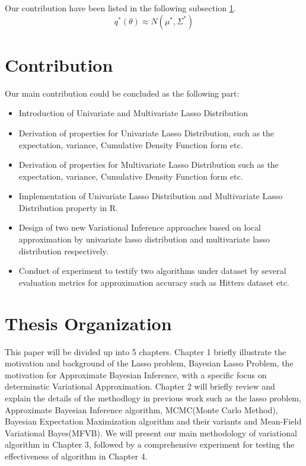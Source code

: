 Our contribution have been listed in the following subsection \ref{cont}.
\begin{equation}
	\label{eq:GV}
	q^{*}(\theta) \approx N(\mu^*,\Sigma^*)
\end{equation}

\section{Contribution}
\label{cont}
Our main contribution could be concluded as the following part:
\begin{itemize}
	\item Introduction of Univariate and Multivariate Lasso Distribution
	\item Derivation of properties for Univariate Lasso Distribution, such as the expectation, variance, Cumulative Density Function form etc.
	\item Derivation of properties for Multivariate Lasso Distribution such as the expectation, variance, Cumulative Density Function form etc.
	\item Implementation of Univariate Lasso Distribution and Multivariate Lasso Distribution property in R.
	\item Design of two new Variational Inference approaches based on local approximation by univariate lasso distribution and multivariate lasso distribution respectively.
	\item Conduct of experiment to testify two algorithms under dataset by several evaluation metrics for approximation accuracy such as Hitters dataset etc.
\end{itemize}



\section{Thesis Organization}
This paper will be divided up into 5 chapters. Chapter 1 briefly illustrate the motivation and background of the Lasso problem, Bayesian Lasso Problem, the motivation for Approximate Bayesian Inference, with a specific focus on determinstic  Variational Approximation. Chapter 2 will briefly review and explain the details of the methodlogy in previous work such as the lasso problem, Approximate Bayesian Inference algorithm, MCMC(Monte Carlo Method), Bayesian Expectation Maximization algorithm and their variants and Mean-Field Variational Bayes(MFVB). We will present our main methodology of variational algorithm in Chapter 3, followed by a comprehensive experiment for testing the effectiveness of algorithm in Chapter 4. 



 